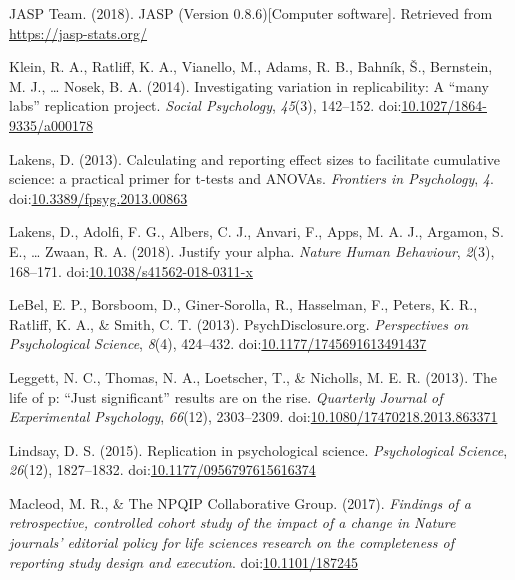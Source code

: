 \documentclass[english,,man,mask]{apa6}
\theoremstyle{definition}
\theoremstyle{definition}
\theoremstyle{definition}
\theoremstyle{remark}
\begin{document}
\hypertarget{ref-JASP2018}{}
JASP Team. (2018). JASP (Version 0.8.6){[}Computer software{]}.
Retrieved from \url{https://jasp-stats.org/}

\hypertarget{ref-Klein2014c}{}
Klein, R. A., Ratliff, K. A., Vianello, M., Adams, R. B., Bahník, Š.,
Bernstein, M. J., \ldots{} Nosek, B. A. (2014). Investigating variation
in replicability: A ``many labs'' replication project. \emph{Social
Psychology}, \emph{45}(3), 142--152.
doi:\href{https://doi.org/10.1027/1864-9335/a000178}{10.1027/1864-9335/a000178}

\hypertarget{ref-Lakens2013}{}
Lakens, D. (2013). Calculating and reporting effect sizes to facilitate
cumulative science: a practical primer for t-tests and ANOVAs.
\emph{Frontiers in Psychology}, \emph{4}.
doi:\href{https://doi.org/10.3389/fpsyg.2013.00863}{10.3389/fpsyg.2013.00863}

\hypertarget{ref-Lakens2018}{}
Lakens, D., Adolfi, F. G., Albers, C. J., Anvari, F., Apps, M. A. J.,
Argamon, S. E., \ldots{} Zwaan, R. A. (2018). Justify your alpha.
\emph{Nature Human Behaviour}, \emph{2}(3), 168--171.
doi:\href{https://doi.org/10.1038/s41562-018-0311-x}{10.1038/s41562-018-0311-x}

\hypertarget{ref-LeBel2013}{}
LeBel, E. P., Borsboom, D., Giner-Sorolla, R., Hasselman, F., Peters, K.
R., Ratliff, K. A., \& Smith, C. T. (2013). PsychDisclosure.org.
\emph{Perspectives on Psychological Science}, \emph{8}(4), 424--432.
doi:\href{https://doi.org/10.1177/1745691613491437}{10.1177/1745691613491437}

\hypertarget{ref-Leggett}{}
Leggett, N. C., Thomas, N. A., Loetscher, T., \& Nicholls, M. E. R.
(2013). The life of p: ``Just significant'' results are on the rise.
\emph{Quarterly Journal of Experimental Psychology}, \emph{66}(12),
2303--2309.
doi:\href{https://doi.org/10.1080/17470218.2013.863371}{10.1080/17470218.2013.863371}

\hypertarget{ref-Lindsay2015}{}
Lindsay, D. S. (2015). Replication in psychological science.
\emph{Psychological Science}, \emph{26}(12), 1827--1832.
doi:\href{https://doi.org/10.1177/0956797615616374}{10.1177/0956797615616374}

\hypertarget{ref-Macleod2017}{}
Macleod, M. R., \& The NPQIP Collaborative Group. (2017). \emph{Findings
of a retrospective, controlled cohort study of the impact of a change in
Nature journals' editorial policy for life sciences research on the
completeness of reporting study design and execution}.
doi:\href{https://doi.org/10.1101/187245}{10.1101/187245}
\end{document}
